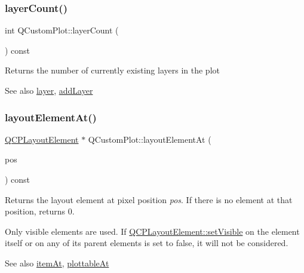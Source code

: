 \mbox{\label{class_q_custom_plot_afa45d61e65292026f4c58c9c88c2cef0}} 
\subsubsection{\texorpdfstring{layerCount()}{layerCount()}}
{\footnotesize\ttfamily int Q\+Custom\+Plot\+::layer\+Count (\begin{DoxyParamCaption}{ }\end{DoxyParamCaption}) const}

Returns the number of currently existing layers in the plot

\begin{DoxySeeAlso}{See also}
\mbox{\hyperlink{class_q_custom_plot_a0a96244e7773b242ef23c32b7bdfb159}{layer}}, \mbox{\hyperlink{class_q_custom_plot_ad5255393df078448bb6ac83fa5db5f52}{add\+Layer}} 
\end{DoxySeeAlso}
\mbox{\label{class_q_custom_plot_afaa1d304e0287d140fd238e90889ef3c}} 
\subsubsection{\texorpdfstring{layoutElementAt()}{layoutElementAt()}}
{\footnotesize\ttfamily \mbox{\hyperlink{class_q_c_p_layout_element}{Q\+C\+P\+Layout\+Element}} $\ast$ Q\+Custom\+Plot\+::layout\+Element\+At (\begin{DoxyParamCaption}\item[{const Q\+PointF \&}]{pos }\end{DoxyParamCaption}) const}

Returns the layout element at pixel position {\itshape pos}. If there is no element at that position, returns 0.

Only visible elements are used. If \mbox{\hyperlink{class_q_c_p_layerable_a3bed99ddc396b48ce3ebfdc0418744f8}{Q\+C\+P\+Layout\+Element\+::set\+Visible}} on the element itself or on any of its parent elements is set to false, it will not be considered.

\begin{DoxySeeAlso}{See also}
\mbox{\hyperlink{class_q_custom_plot_ac08578e0e6c059c83a8d340ba0038e8e}{item\+At}}, \mbox{\hyperlink{class_q_custom_plot_acddbbd8b16dd633f0d94e5a736fbd8cf}{plottable\+At}} 
\end{DoxySeeAlso}
\mbox{\label{class_q_custom_plot_a79cff0baafbca10a3aaf694d2d3b9ab3}} 

